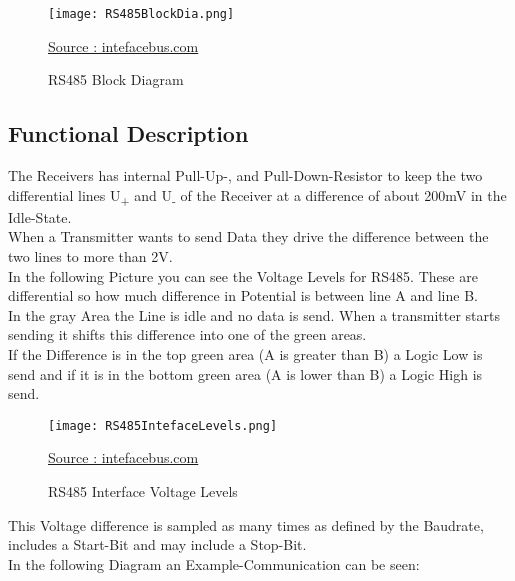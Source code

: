 \begin{figure}[!ht]
	\texttt{[image: RS485BlockDia.png]}
	\caption{RS485 Block Diagram}
	\begin{center}
		\href{http://www.interfacebus.com/Design_Connector_RS485.html#d}{Source : intefacebus.com}
	\end{center}
	\label{fig:RS485BlockDia}
\end{figure}

\pagebreak

\subsection{Functional Description}
\label{subsec:RS_FuncDes}

The Receivers has internal Pull-Up-, and Pull-Down-Resistor to keep the two differential lines U\textsubscript{+} and U\textsubscript{-} of the Receiver at a difference of about 200mV in the Idle-State.\\
When a Transmitter wants to send Data they drive the difference between the
two lines to more than 2V.\\
In the following Picture you can see the Voltage Levels for RS485.
These are differential so how much difference in Potential is between line A and line B.\\
In the gray Area the Line is idle and no data is send.
When a transmitter starts sending it shifts this difference into one of the green
areas.\\
If the Difference is in the top green area (A is greater than B) a Logic Low is send and if it is in the bottom green area (A is lower than B) a Logic High is send.\\

\begin{figure}[!ht]
	\texttt{[image: RS485IntefaceLevels.png]}
	\caption{RS485 Interface Voltage Levels}
	\begin{center}
		\href{http://www.interfacebus.com/Design_Connector_RS485.html#d}{Source : intefacebus.com}
	\end{center}
	\label{fig:RS485VolLevels}
\end{figure}

\pagebreak

This Voltage difference is sampled as many times as defined by the Baudrate,
includes a Start-Bit and may include a Stop-Bit.\\
In the following Diagram an Example-Communication can be seen:

